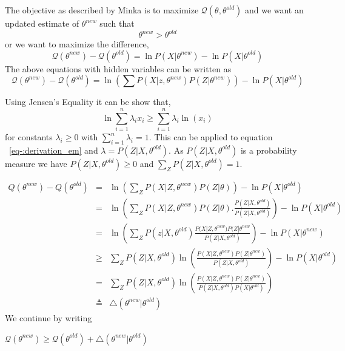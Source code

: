 \documentclass[12pt]{dalcsthesis}
\begin{document}
The objective as described by Minka \cite{minka1998expectation} is to maximize $\mathcal{Q}(\theta,\theta^{old})$ and we want an updated estimate of $\theta^{new}$ such that 
\begin{equation}
\theta^{new}>\theta^{old}
\end{equation}
or we want to maximize the difference,
\begin{equation}
\mathcal{Q}(\theta^{new})-\mathcal{Q}(\theta^{old})=\ln P(X|\theta^{new}) - \ln P(X|\theta^{old})
\end{equation}
The above equations with hidden variables can be written as
\begin{equation}
\label{eq-:derivation_em}
\mathcal{Q}(\theta^{new})-\mathcal{Q}(\theta^{old})=\ln(\sum P(X|z,\theta^{new}) P(Z|\theta^{new})) - \ln P(X|\theta^{old})
\end{equation}

Using Jensen's Equality it can be show that,
\begin{equation}
\ln \sum_{i=1}^{n}\lambda_{i}x_{i} \geq \sum_{i=1}^{n}\lambda_{i}\ln(x_{i})
\end{equation}
for constants $\lambda_{i} \geq 0$ with $\sum_{i=1}^{n}\lambda_{i}=1$. This can be applied to equation ~\ref{eq-:derivation_em} and $\lambda=P(Z|X,\theta^{old})$. As $P(Z|X,\theta^{old})$ is a probability measure we have $P(Z|X,\theta^{old}) \geq 0$ and $\sum_{Z}P(Z|X,\theta^{old})=1$.

\begin{eqnarray}
Q(\theta^{new})-Q(\theta^{old}) & = & \ln(\sum_{Z}P(X|Z,\theta^{new})P(Z|\theta))-\ln P(X|\theta^{old})\\
 & = & \ln(\sum_{Z}P(X|Z,\theta^{new})P(Z|\theta).\frac{P(Z|X,\theta^{old})}{P(Z|X,\theta^{old})})-\ln P(X|\theta^{old})\\
 & = & \ln(\sum_{Z}P(z|X,\theta^{old})\frac{P(X|Z,\theta^{new})P(Z|\theta^{new}}{P(Z|X,\theta^{old})})-\ln P(X|\theta^{new})\\
 & \geq & \sum_{Z}P(Z|X,\theta^{old})\ln(\frac{P(X|Z,\theta^{new})P(Z|\theta^{new})}{P(Z|X,\theta^{old})})-\ln P(X|\theta^{old})\\
 & = & \sum_{Z}P(Z|X,\theta^{old})\ln(\frac{P(X|Z,\theta^{new})P(Z|\theta^{new})}{P(Z|X,\theta^{old})P(X|\theta^{old})})\\
 & \triangleq & \triangle(\theta^{new}|\theta^{old})
\end{eqnarray}
We continue by writing

$\mathcal{Q}(\theta^{new})\geq\mathcal{Q}(\theta^{old})+\triangle(\theta^{new}|\theta^{old})$
\end{document}
